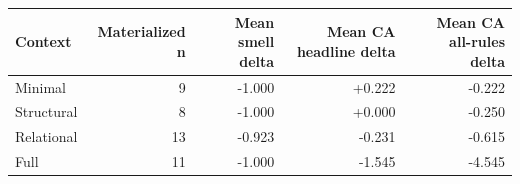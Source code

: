 \begin{tabular}{lrrrr}
\toprule
Context & Materialized n & Mean smell delta & Mean CA headline delta & Mean CA all-rules delta \\
\midrule
Minimal & 9 & -1.000 & +0.222 & -0.222 \\
Structural & 8 & -1.000 & +0.000 & -0.250 \\
Relational & 13 & -0.923 & -0.231 & -0.615 \\
Full & 11 & -1.000 & -1.545 & -4.545 \\
\bottomrule
\end{tabular}

